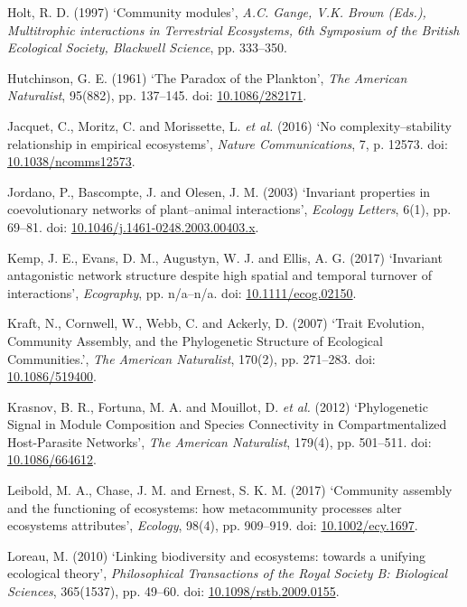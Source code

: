 \documentclass[12pt]{article}
\begin{document}
\hypertarget{ref-holt97cm}{}
Holt, R. D. (1997) `Community modules', \emph{A.C. Gange, V.K. Brown
(Eds.), Multitrophic interactions in Terrestrial Ecosystems, 6th
Symposium of the British Ecological Society, Blackwell Science}, pp.
333--350.

\hypertarget{ref-hutc61pp}{}
Hutchinson, G. E. (1961) `The Paradox of the Plankton', \emph{The
American Naturalist}, 95(882), pp. 137--145. doi:
\href{https://doi.org/10.1086/282171}{10.1086/282171}.

\hypertarget{ref-jacq16ncr}{}
Jacquet, C., Moritz, C. and Morissette, L. \emph{et al.} (2016) `No
complexity--stability relationship in empirical ecosystems',
\emph{Nature Communications}, 7, p. 12573. doi:
\href{https://doi.org/10.1038/ncomms12573}{10.1038/ncomms12573}.

\hypertarget{ref-jord03ipc}{}
Jordano, P., Bascompte, J. and Olesen, J. M. (2003) `Invariant
properties in coevolutionary networks of plant--animal interactions',
\emph{Ecology Letters}, 6(1), pp. 69--81. doi:
\href{https://doi.org/10.1046/j.1461-0248.2003.00403.x}{10.1046/j.1461-0248.2003.00403.x}.

\hypertarget{ref-kemp17ian}{}
Kemp, J. E., Evans, D. M., Augustyn, W. J. and Ellis, A. G. (2017)
`Invariant antagonistic network structure despite high spatial and
temporal turnover of interactions', \emph{Ecography}, pp. n/a--n/a. doi:
\href{https://doi.org/10.1111/ecog.02150}{10.1111/ecog.02150}.

\hypertarget{ref-kraf07tec}{}
Kraft, N., Cornwell, W., Webb, C. and Ackerly, D. (2007) `Trait
Evolution, Community Assembly, and the Phylogenetic Structure of
Ecological Communities.', \emph{The American Naturalist}, 170(2), pp.
271--283. doi: \href{https://doi.org/10.1086/519400}{10.1086/519400}.

\hypertarget{ref-kras12psm}{}
Krasnov, B. R., Fortuna, M. A. and Mouillot, D. \emph{et al.} (2012)
`Phylogenetic Signal in Module Composition and Species Connectivity in
Compartmentalized Host-Parasite Networks', \emph{The American
Naturalist}, 179(4), pp. 501--511. doi:
\href{https://doi.org/10.1086/664612}{10.1086/664612}.

\hypertarget{ref-leib17caf}{}
Leibold, M. A., Chase, J. M. and Ernest, S. K. M. (2017) `Community
assembly and the functioning of ecosystems: how metacommunity processes
alter ecosystems attributes', \emph{Ecology}, 98(4), pp. 909--919. doi:
\href{https://doi.org/10.1002/ecy.1697}{10.1002/ecy.1697}.

\hypertarget{ref-lore10lbe}{}
Loreau, M. (2010) `Linking biodiversity and ecosystems: towards a
unifying ecological theory', \emph{Philosophical Transactions of the
Royal Society B: Biological Sciences}, 365(1537), pp. 49--60. doi:
\href{https://doi.org/10.1098/rstb.2009.0155}{10.1098/rstb.2009.0155}.
\end{document}
